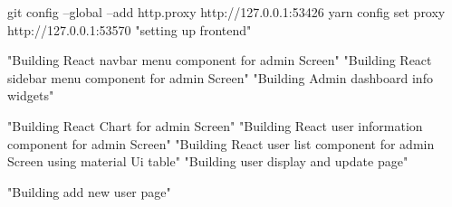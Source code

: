 git config --global --add http.proxy http://127.0.0.1:53426
yarn config set proxy http://127.0.0.1:53570
"setting up frontend"

"Building React navbar menu component for admin Screen"
"Building React sidebar menu component for admin Screen"
"Building Admin dashboard info widgets"

"Building React Chart for admin Screen"
"Building React user information component for admin Screen"
"Building React user list component for admin Screen using material Ui table"
"Building user display and update page"


"Building add new user page"
